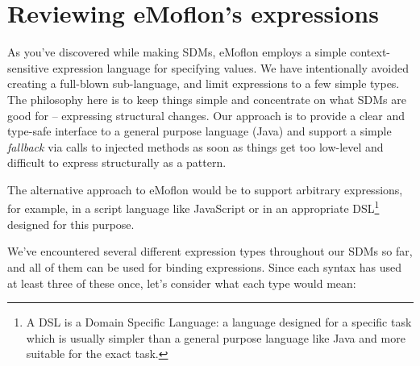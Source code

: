 \newpage
\section{Reviewing eMoflon's expressions}
\genHeader

As you've discovered while making SDMs, eMoflon employs a simple context-sensitive expression language for specifying  values. We have intentionally avoided
creating a full-blown sub-language, and limit expressions to a few simple types. The philosophy here is to keep things simple and concentrate on what SDMs are good for -- expressing structural
changes. Our approach is to provide a clear and type-safe interface to a general purpose language (Java) and support a simple \emph{fallback} via calls to
injected methods as soon as things get too low-level and difficult to express structurally as a pattern.

The alternative approach to eMoflon would be to support arbitrary expressions, for example, in a script language like JavaScript or in an appropriate
DSL\footnote{A DSL is a Domain Specific Language: a language designed for a specific task which is usually simpler than a general purpose language like Java and
more suitable for the exact task.} designed for this purpose. 

We've encountered several different expression types throughout our SDMs so far, and all of them can be used for binding expressions. Since each syntax has
used at least three of these once, let's consider what each type would mean:

